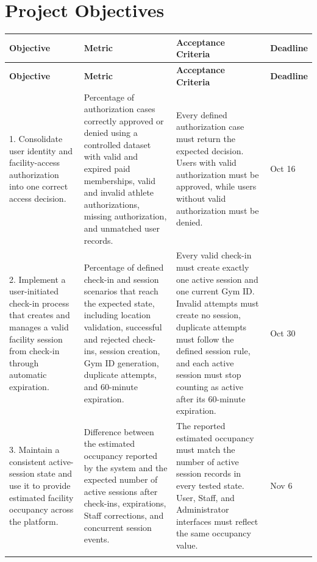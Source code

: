 \documentclass[11pt,letterpaper]{article}
\begin{document}
\section{Project Objectives}

\begin{center}
\small
\begin{longtable}{L{3.1cm} L{4.2cm} L{4.2cm} L{1.8cm}}
\toprule
\textbf{Objective} & \textbf{Metric} & \textbf{Acceptance Criteria} & \textbf{Deadline} \\
\midrule
\endfirsthead
\toprule
\textbf{Objective} & \textbf{Metric} & \textbf{Acceptance Criteria} & \textbf{Deadline} \\
\midrule
\endhead
\bottomrule
\endlastfoot

1. Consolidate user identity and facility-access authorization into one correct access decision.
&
Percentage of authorization cases correctly approved or denied using a controlled dataset with valid and expired paid memberships, valid and invalid athlete authorizations, missing authorization, and unmatched user records.
&
Every defined authorization case must return the expected decision. Users with valid authorization must be approved, while users without valid authorization must be denied.
&
Oct 16 \\
\addlinespace
\midrule
\addlinespace

2. Implement a user-initiated check-in process that creates and manages a valid facility session from check-in through automatic expiration.
&
Percentage of defined check-in and session scenarios that reach the expected state, including location validation, successful and rejected check-ins, session creation, Gym ID generation, duplicate attempts, and 60-minute expiration.
&
Every valid check-in must create exactly one active session and one current Gym ID. Invalid attempts must create no session, duplicate attempts must follow the defined session rule, and each active session must stop counting as active after its 60-minute expiration.
&
Oct 30 \\
\addlinespace
\midrule
\addlinespace

3. Maintain a consistent active-session state and use it to provide estimated facility occupancy across the platform.
&
Difference between the estimated occupancy reported by the system and the expected number of active sessions after check-ins, expirations, Staff corrections, and concurrent session events.
&
The reported estimated occupancy must match the number of active session records in every tested state. User, Staff, and Administrator interfaces must reflect the same occupancy value.
&
Nov 6 \\
\addlinespace
\midrule
\addlinespace


\end{longtable}
\end{center}
\end{document}
